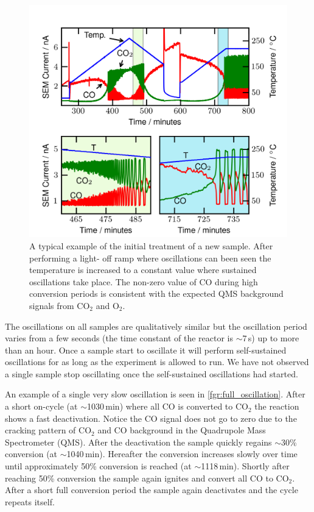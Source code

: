 \documentclass[journal=jacsat,manuscript=article]{achemso}
\begin{document}
\begin{figure}
  \includegraphics[width=12cm]{initial_treatment.png} 
  \caption{A typical example of the initial treatment of a new sample. After
  performing a light- off ramp where oscillations can been seen the temperature
  is increased to a constant value where sustained oscillations take place. The
  non-zero value of CO during high conversion periods is consistent with the
  expected QMS background signals from CO$_2$ and O$_2$.}
  \label{fgr:initial_treatment}
\end{figure}

The oscillations on all samples are qualitatively similar but the oscillation
period varies from a few seconds (the time constant of the reactor is
$\sim7\,$s) up to more than an hour. Once a sample start to oscillate it will
perform self-sustained oscillations for as long as the experiment is allowed to
run. We have not observed a single sample stop oscillating once the self-sustained oscillations had started.

An example of a single very slow oscillation is seen in
\ref{fgr:full_oscillation}. After a short on-cycle (at $\sim$1030\,min) where
all CO is converted to CO$_2$ the reaction shows a fast deactivation. 
Notice the CO signal does not go to zero due to the cracking pattern of
CO$_2$ and CO background in the Quadrupole Mass Spectrometer (QMS).
After the deactivation the sample quickly regains
$\sim$30\% conversion (at $\sim$1040\,min). Hereafter the conversion increases
slowly over time until approximately 50\% conversion is reached (at
$\sim$1118\,min). Shortly after reaching 50\% conversion the sample again
ignites and convert all CO to CO$_2$. After a short full conversion period the
sample again deactivates and the cycle repeats itself.
\end{document}
